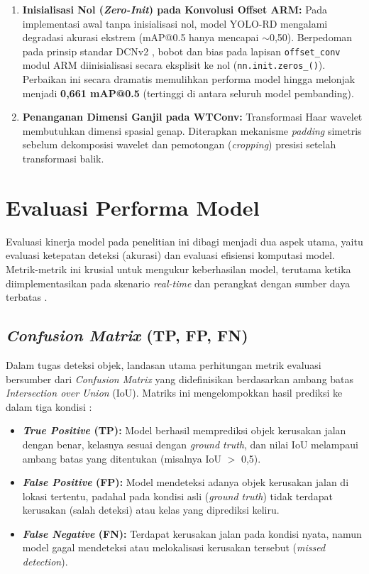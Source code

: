 \begin{enumerate}
	\item \textbf{Inisialisasi Nol (\textit{Zero-Init}) pada Konvolusi Offset ARM:} Pada implementasi awal tanpa inisialisasi nol, model YOLO-RD mengalami degradasi akurasi ekstrem (mAP@0.5 hanya mencapai $\sim$0,50). Berpedoman pada prinsip standar DCNv2 \cite{dai2017deformable}, bobot dan bias pada lapisan \texttt{offset\_conv} modul ARM diinisialisasi secara eksplisit ke nol (\texttt{nn.init.zeros\_()}). Perbaikan ini secara dramatis memulihkan performa model hingga melonjak menjadi \textbf{0,661 mAP@0.5} (tertinggi di antara seluruh model pembanding).
	\item \textbf{Penanganan Dimensi Ganjil pada WTConv:} Transformasi Haar wavelet membutuhkan dimensi spasial genap. Diterapkan mekanisme \textit{padding} simetris sebelum dekomposisi wavelet dan pemotongan (\textit{cropping}) presisi setelah transformasi balik.
\end{enumerate}

\section{Evaluasi Performa Model}
Evaluasi kinerja model pada penelitian ini dibagi menjadi dua aspek utama, yaitu evaluasi ketepatan deteksi (akurasi) dan evaluasi efisiensi komputasi model. Metrik-metrik ini krusial untuk mengukur keberhasilan model, terutama ketika diimplementasikan pada skenario \textit{real-time} dan perangkat dengan sumber daya terbatas \cite{Wu2023}.

\subsection{\textit{Confusion Matrix} (TP, FP, FN)}
Dalam tugas deteksi objek, landasan utama perhitungan metrik evaluasi bersumber dari \textit{Confusion Matrix} yang didefinisikan berdasarkan ambang batas \textit{Intersection over Union} (IoU). Matriks ini mengelompokkan hasil prediksi ke dalam tiga kondisi \cite{Li2024, Zeng2024}:
\begin{itemize}
	\item \textbf{\textit{True Positive} (TP):} Model berhasil memprediksi objek kerusakan jalan dengan benar, kelasnya sesuai dengan \textit{ground truth}, dan nilai IoU melampaui ambang batas yang ditentukan (misalnya IoU $>$ 0,5).
	\item \textbf{\textit{False Positive} (FP):} Model mendeteksi adanya objek kerusakan jalan di lokasi tertentu, padahal pada kondisi asli (\textit{ground truth}) tidak terdapat kerusakan (salah deteksi) atau kelas yang diprediksi keliru.
	\item \textbf{\textit{False Negative} (FN):} Terdapat kerusakan jalan pada kondisi nyata, namun model gagal mendeteksi atau melokalisasi kerusakan tersebut (\textit{missed detection}).
\end{itemize}

